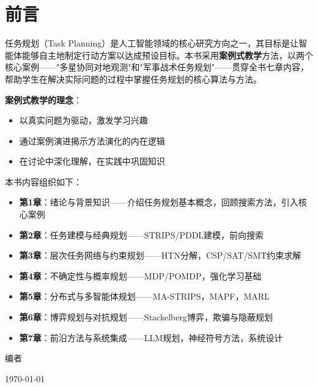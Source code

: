 \documentclass[a4paper,12pt,openany]{ctexbook}
\theoremstyle{definition}
\theoremstyle{plain}
\begin{document}
\clearpage

\tableofcontents

\chapter*{前言}

任务规划（Task Planning）是人工智能领域的核心研究方向之一，其目标是让智能体能够自主地制定行动方案以达成预设目标。本书采用\textbf{案例式教学}方法，以两个核心案例——"多星协同对地观测"和"军事战术任务规划"——贯穿全书七章内容，帮助学生在解决实际问题的过程中掌握任务规划的核心算法与方法。

\textbf{案例式教学的理念}：
\begin{itemize}[leftmargin=2em]
  \item 以真实问题为驱动，激发学习兴趣
  \item 通过案例演进揭示方法演化的内在逻辑
  \item 在讨论中深化理解，在实践中巩固知识
\end{itemize}

本书内容组织如下：
\begin{itemize}[leftmargin=2em]
  \item \textbf{第1章}：绪论与背景知识——介绍任务规划基本概念，回顾搜索方法，引入核心案例
  \item \textbf{第2章}：任务建模与经典规划——STRIPS/PDDL建模，前向搜索
  \item \textbf{第3章}：层次任务网络与约束规划——HTN分解，CSP/SAT/SMT约束求解
  \item \textbf{第4章}：不确定性与概率规划——MDP/POMDP，强化学习基础
  \item \textbf{第5章}：分布式与多智能体规划——MA-STRIPS，MAPF，MARL
  \item \textbf{第6章}：博弈规划与对抗规划——Stackelberg博弈，欺骗与隐蔽规划
  \item \textbf{第7章}：前沿方法与系统集成——LLM规划，神经符号方法，系统设计
\end{itemize}

\vspace{2em}
\hfill 编者

\hfill \today




\end{document}

